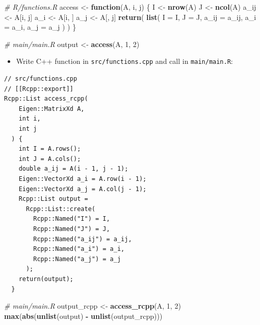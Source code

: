 \documentclass[]{book}
\newenvironment{Shaded}{\begin{snugshade}}{\end{snugshade}}
\newcommand{\KeywordTok}[1]{\textcolor[rgb]{0.13,0.29,0.53}{\textbf{#1}}}
\newcommand{\DataTypeTok}[1]{\textcolor[rgb]{0.13,0.29,0.53}{#1}}
\newcommand{\DecValTok}[1]{\textcolor[rgb]{0.00,0.00,0.81}{#1}}
\newcommand{\StringTok}[1]{\textcolor[rgb]{0.31,0.60,0.02}{#1}}
\newcommand{\CommentTok}[1]{\textcolor[rgb]{0.56,0.35,0.01}{\textit{#1}}}
\newcommand{\ControlFlowTok}[1]{\textcolor[rgb]{0.13,0.29,0.53}{\textbf{#1}}}
\newcommand{\OperatorTok}[1]{\textcolor[rgb]{0.81,0.36,0.00}{\textbf{#1}}}
\newcommand{\NormalTok}[1]{#1}
\providecommand{\tightlist}{%
  \setlength{\itemsep}{0pt}\setlength{\parskip}{0pt}}
\begin{document}
\begin{Shaded}
\begin{Highlighting}[]
\CommentTok{# R/functions.R}
\NormalTok{access <-}\StringTok{ }
\StringTok{  }\ControlFlowTok{function}\NormalTok{(A, i, j) \{}
\NormalTok{    I <-}\StringTok{ }\KeywordTok{nrow}\NormalTok{(A)}
\NormalTok{    J <-}\StringTok{ }\KeywordTok{ncol}\NormalTok{(A)}
\NormalTok{    a_ij <-}\StringTok{ }\NormalTok{A[i, j]}
\NormalTok{    a_i <-}\StringTok{ }\NormalTok{A[i, ]}
\NormalTok{    a_j <-}\StringTok{ }\NormalTok{A[, j]}
    \KeywordTok{return}\NormalTok{(}
      \KeywordTok{list}\NormalTok{(}
        \DataTypeTok{I =}\NormalTok{ I,}
        \DataTypeTok{J =}\NormalTok{ J,}
        \DataTypeTok{a_ij =}\NormalTok{ a_ij,}
        \DataTypeTok{a_i =}\NormalTok{ a_i,}
        \DataTypeTok{a_j =}\NormalTok{ a_j}
\NormalTok{      )}
\NormalTok{    )}
\NormalTok{  \}}
\end{Highlighting}
\end{Shaded}

\begin{Shaded}
\begin{Highlighting}[]
\CommentTok{# main/main.R}
\NormalTok{output <-}\StringTok{ }\KeywordTok{access}\NormalTok{(A, }\DecValTok{1}\NormalTok{, }\DecValTok{2}\NormalTok{)}
\end{Highlighting}
\end{Shaded}

\begin{itemize}
\tightlist
\item
  Write C++ function in \texttt{src/functions.cpp} and call in
  \texttt{main/main.R}:
\end{itemize}

\begin{verbatim}
// src/functions.cpp
// [[Rcpp::export]]
Rcpp::List access_rcpp(
    Eigen::MatrixXd A, 
    int i, 
    int j
  ) {
    int I = A.rows();
    int J = A.cols();
    double a_ij = A(i - 1, j - 1);
    Eigen::VectorXd a_i = A.row(i - 1);
    Eigen::VectorXd a_j = A.col(j - 1);
    Rcpp::List output =
      Rcpp::List::create(
        Rcpp::Named("I") = I,
        Rcpp::Named("J") = J,
        Rcpp::Named("a_ij") = a_ij,
        Rcpp::Named("a_i") = a_i,
        Rcpp::Named("a_j") = a_j
      );
    return(output);
  }
\end{verbatim}

\begin{Shaded}
\begin{Highlighting}[]
\CommentTok{# main/main.R}
\NormalTok{output_rcpp <-}\StringTok{ }\KeywordTok{access_rcpp}\NormalTok{(A, }\DecValTok{1}\NormalTok{, }\DecValTok{2}\NormalTok{)}
\KeywordTok{max}\NormalTok{(}\KeywordTok{abs}\NormalTok{(}\KeywordTok{unlist}\NormalTok{(output) }\OperatorTok{-}\StringTok{ }\KeywordTok{unlist}\NormalTok{(output_rcpp)))}
\end{Highlighting}
\end{Shaded}
\end{document}

